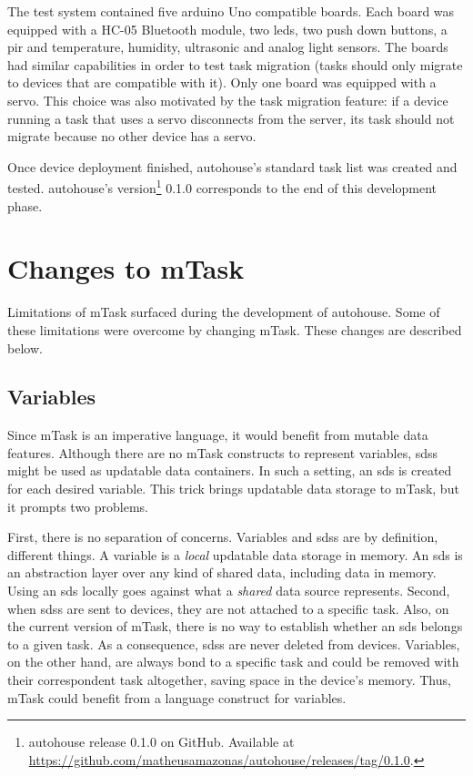 The test system contained five \gls{arduino} Uno compatible boards. Each board was equipped with a HC-05 Bluetooth module, two \acsp{led}, two push down buttons, a \acs{pir} and temperature, humidity, ultrasonic and analog light sensors. The boards had similar capabilities in order to test task migration (tasks should only migrate to devices that are compatible with it). Only one board was equipped with a \gls{servo}. This choice was also motivated by the task migration feature: if a device running a task that uses a \gls{servo} disconnects from the server, its task should not migrate because no other device has a \gls{servo}.

Once device deployment finished, \gls{autohouse}'s standard task list was created and tested. \gls{autohouse}'s version\footnote{\gls{autohouse} release 0.1.0 on GitHub. Available at \url{https://github.com/matheusamazonas/autohouse/releases/tag/0.1.0}.} 0.1.0 corresponds to the end of this development phase.

\section{Changes to mTask}\label{sec:mtask_changes}

Limitations of \gls{mTask} surfaced during the development of \gls{autohouse}. Some of these limitations were overcome by changing \gls{mTask}. These changes are described below.

\subsection{Variables}

Since \gls{mTask} is an imperative language, it would benefit from mutable data features. Although there are no \gls{mTask} constructs to represent variables, \acp{sds} might be used as updatable data containers. In such a setting, an \ac{sds} is created for each desired variable. This trick brings updatable data storage to \gls{mTask}, but it prompts two problems. 

First, there is no separation of concerns. Variables and \acp{sds} are by definition, different things. A variable is a \textit{local} updatable data storage in memory. An \ac{sds} is an abstraction layer over any kind of shared data, including data in memory. Using an \ac{sds} locally goes against what a \textit{shared} data source represents. Second, when \acp{sds} are sent to devices, they are not attached to a specific task. Also, on the current version of \gls{mTask}, there is no way to establish whether an \ac{sds} belongs to a given task. As a consequence, \acp{sds} are never deleted from devices. Variables, on the other hand, are always bond to a specific task and could be removed with their correspondent task altogether, saving space in the device's memory. Thus, \gls{mTask} could benefit from a language construct for variables. 

